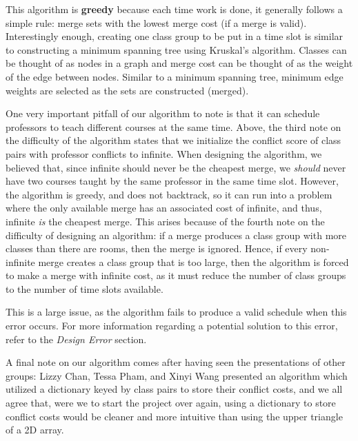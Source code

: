 \documentclass[11pt, oneside]{article}   	%
\begin{document}
This algorithm is {\bf greedy} because each time work is done, it generally follows a simple rule: merge sets with the lowest merge cost (if a merge is valid). Interestingly enough, creating one class group to be put in a time slot is similar to constructing a minimum spanning tree using Kruskal's algorithm. Classes can be thought of as nodes in a graph and merge cost can be thought of as the weight of the edge between nodes. Similar to a minimum spanning tree, minimum edge weights are selected as the sets are constructed (merged).

One very important pitfall of our algorithm to note is that it can schedule professors to teach different courses at the same time. Above, the third note on the difficulty of the algorithm states that we initialize the conflict score of class pairs with professor conflicts to infinite. When designing the algorithm, we believed that, since infinite should never be the cheapest merge, we \textit{should} never have two courses taught by the same professor in the same time slot. However, the algorithm is greedy, and does not backtrack, so it can run into a problem where the only available merge has an associated cost of infinite, and thus, infinite \textit{is} the cheapest merge. This arises because of the fourth note on the difficulty of designing an algorithm: if a merge produces a class group with more classes than there are rooms, then the merge is ignored. Hence, if every non-infinite merge creates a class group that is too large, then the algorithm is forced to make a merge with infinite cost, as it must reduce the number of class groups to the number of time slots available.

This is a large issue, as the algorithm fails to produce a valid schedule when this error occurs. For more information regarding a potential solution to this error, refer to the \textit{Design Error} section.

A final note on our algorithm comes after having seen the presentations of other groups: Lizzy Chan, Tessa Pham, and Xinyi Wang presented an algorithm which utilized a dictionary keyed by class pairs to store their conflict costs, and we all agree that, were we to start the project over again, using a dictionary to store conflict costs would be cleaner and more intuitive than using the upper triangle of a 2D array.
\end{document}
